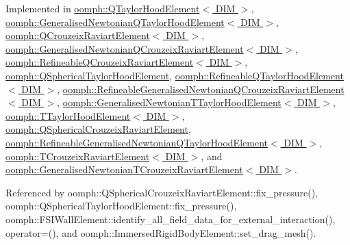 Implemented in \hyperlink{classoomph_1_1QTaylorHoodElement_af14ad75ea276ed120e620646f48dcc0c}{oomph\+::\+Q\+Taylor\+Hood\+Element$<$ D\+I\+M $>$}, \hyperlink{classoomph_1_1GeneralisedNewtonianQTaylorHoodElement_a93fa12a6111a676cb6e7ac2528266d07}{oomph\+::\+Generalised\+Newtonian\+Q\+Taylor\+Hood\+Element$<$ D\+I\+M $>$}, \hyperlink{classoomph_1_1QCrouzeixRaviartElement_ae57ed7defb77ccaa537a5d9caae68172}{oomph\+::\+Q\+Crouzeix\+Raviart\+Element$<$ D\+I\+M $>$}, \hyperlink{classoomph_1_1GeneralisedNewtonianQCrouzeixRaviartElement_a49a4adf55b10a9aab75f864597e892cd}{oomph\+::\+Generalised\+Newtonian\+Q\+Crouzeix\+Raviart\+Element$<$ D\+I\+M $>$}, \hyperlink{classoomph_1_1RefineableQCrouzeixRaviartElement_ad2389a0bad47e50cb11cb2cea3f57b24}{oomph\+::\+Refineable\+Q\+Crouzeix\+Raviart\+Element$<$ D\+I\+M $>$}, \hyperlink{classoomph_1_1QSphericalTaylorHoodElement_a3f964db0b1ca6e1edd0c2b450b79af6d}{oomph\+::\+Q\+Spherical\+Taylor\+Hood\+Element}, \hyperlink{classoomph_1_1RefineableQTaylorHoodElement_af9358dd7b65ca4a1005980d50986db0d}{oomph\+::\+Refineable\+Q\+Taylor\+Hood\+Element$<$ D\+I\+M $>$}, \hyperlink{classoomph_1_1RefineableGeneralisedNewtonianQCrouzeixRaviartElement_a14c12617fd3fe6ea248c2ec54993b0a5}{oomph\+::\+Refineable\+Generalised\+Newtonian\+Q\+Crouzeix\+Raviart\+Element$<$ D\+I\+M $>$}, \hyperlink{classoomph_1_1GeneralisedNewtonianTTaylorHoodElement_ac6da3eea70b3ad498c42a91dc9c67237}{oomph\+::\+Generalised\+Newtonian\+T\+Taylor\+Hood\+Element$<$ D\+I\+M $>$}, \hyperlink{classoomph_1_1TTaylorHoodElement_adfc82bce12e96bb4e93e855dd16ac195}{oomph\+::\+T\+Taylor\+Hood\+Element$<$ D\+I\+M $>$}, \hyperlink{classoomph_1_1QSphericalCrouzeixRaviartElement_a3ef0fa0d09e3a9e495f348801723d549}{oomph\+::\+Q\+Spherical\+Crouzeix\+Raviart\+Element}, \hyperlink{classoomph_1_1RefineableGeneralisedNewtonianQTaylorHoodElement_a1ac7edfbc1114f039d4ed73ad9234be3}{oomph\+::\+Refineable\+Generalised\+Newtonian\+Q\+Taylor\+Hood\+Element$<$ D\+I\+M $>$}, \hyperlink{classoomph_1_1TCrouzeixRaviartElement_a009e154cb1934dce92933a36280333a6}{oomph\+::\+T\+Crouzeix\+Raviart\+Element$<$ D\+I\+M $>$}, and \hyperlink{classoomph_1_1GeneralisedNewtonianTCrouzeixRaviartElement_a85b72520add7d7bc30e3b9229a6b73fd}{oomph\+::\+Generalised\+Newtonian\+T\+Crouzeix\+Raviart\+Element$<$ D\+I\+M $>$}.



Referenced by oomph\+::\+Q\+Spherical\+Crouzeix\+Raviart\+Element\+::fix\+\_\+pressure(), oomph\+::\+Q\+Spherical\+Taylor\+Hood\+Element\+::fix\+\_\+pressure(), oomph\+::\+F\+S\+I\+Wall\+Element\+::identify\+\_\+all\+\_\+field\+\_\+data\+\_\+for\+\_\+external\+\_\+interaction(), operator=(), and oomph\+::\+Immersed\+Rigid\+Body\+Element\+::set\+\_\+drag\+\_\+mesh().

